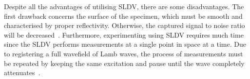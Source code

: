 Despite all the advantages of utilising SLDV, there are some disadvantages. 
The first drawback concerns the surface of the specimen, which must be smooth and characterised by proper reflectivity. Otherwise, the captured signal to noise ratio will be decreased~\cite{Ostachowicz2014}. 
Furthermore, experimenting using  SLDV requires much time since the SLDV performs measurements at a single point in space at a time.
Due to registering a full wavefield of Lamb waves, the process of measurements must be repeated by keeping the same excitation and pause until the wave completely attenuates~\cite{Ostachowicz2014}.
